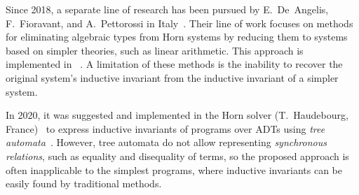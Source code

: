 Since 2018, a separate line of research has been pursued by E.~De~Angelis, F.~Fioravant, and A.~Pettorossi in Italy~\cite{10.1093/logcom/exab090,pettorossi_proietti_2022,10.1007/978-3-030-51074-9_6,angelis_fioravanti_pettorossi_proietti_2018}. Their line of work focuses on methods for eliminating algebraic types from Horn systems by reducing them to systems based on simpler theories, such as linear arithmetic. This approach is implemented in \vericat{}~\cite{de_angelis_proietti_fioravanti_pettorossi_2022}. A limitation of these methods is the inability to recover the original system's inductive invariant from the inductive invariant of a simpler system.


In 2020, it was suggested and implemented in the \rchc{} Horn solver (T.~Haudebourg, France)~\cite{haude2020} to express inductive invariants of programs over ADTs using \emph{tree automata}~\cite{tata}.
However, tree automata do not allow representing \emph{synchronous relations}, such as equality and disequality of terms, so the proposed approach is often inapplicable to the simplest programs, where inductive invariants can be easily found by traditional methods.


